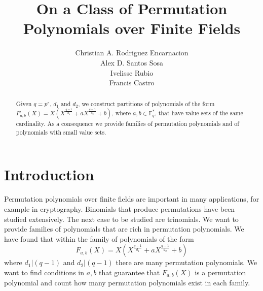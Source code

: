\documentclass{article}
\theoremstyle{definition}
\theoremstyle{remark}
\numberwithin{equation}{section}
\begin{document}
\title{On a Class of Permutation Polynomials over Finite Fields}

\author{Christian A. Rodriguez Encarnacion \\ Alex D. Santos Sosa \\ Ivelisse Rubio \\ Francis Castro}

\maketitle

\begin{abstract}
Given $q=p^r$, $d_1$ and $d_2$, we construct partitions of polynomials of the form $F_{a,b}(X) =X\left(X^{\frac{q-1}{d_1}} + a X^{\frac{q-1}{d_2}} + b \right)$, where $a,b \in \mathbb{F}_{q}^{*}$, that have value sets of the same cardinality. As a consequence we provide families of permutation polynomials and of polynomials with small value sets. 

\end{abstract}


\section{Introduction}

Permutation polynomials over finite fields are important in many applications, for example in cryptography. Binomials that produce permutations have been studied extensively. The next case to be studied are trinomials. We want to provide families of polynomials that are rich in permutation polynomials. We have found that within the family of polynomials of the form $$F_{a,b}(X) = X(X^{\frac{q-1}{d_1}} + aX^{\frac{q-1}{d_2}} +b)$$ where $d_1 | (q-1)$ and $d_2 | (q-1)$  there are many permutation polynomials. We want to find conditions in $a,b$ that guarantee that $F_{a,b}(X)$ is a permutation polynomial and count how many permutation polynomials exist in each family.
\end{document}
